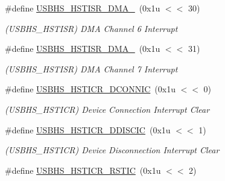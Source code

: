 \begin{DoxyCompactItemize}
\mbox{\label{group__SAME70__USBHS_ga7b43811bc4572ab7cb7fc1399f71a7b3}} 
\#define \mbox{\hyperlink{group__SAME70__USBHS_ga7b43811bc4572ab7cb7fc1399f71a7b3}{U\+S\+B\+H\+S\+\_\+\+H\+S\+T\+I\+S\+R\+\_\+\+D\+M\+A\+\_}}~(0x1u $<$$<$ 30)
\begin{DoxyCompactList}\small\item\em (U\+S\+B\+H\+S\+\_\+\+H\+S\+T\+I\+SR) D\+MA Channel 6 Interrupt \end{DoxyCompactList}\item 
\mbox{\label{group__SAME70__USBHS_ga8f49c8777ee76e4e23a0ea56235cdc9a}} 
\#define \mbox{\hyperlink{group__SAME70__USBHS_ga8f49c8777ee76e4e23a0ea56235cdc9a}{U\+S\+B\+H\+S\+\_\+\+H\+S\+T\+I\+S\+R\+\_\+\+D\+M\+A\+\_}}~(0x1u $<$$<$ 31)
\begin{DoxyCompactList}\small\item\em (U\+S\+B\+H\+S\+\_\+\+H\+S\+T\+I\+SR) D\+MA Channel 7 Interrupt \end{DoxyCompactList}\item 
\mbox{\label{group__SAME70__USBHS_ga0fb7643d5be82c2ea2172850b38484e2}} 
\#define \mbox{\hyperlink{group__SAME70__USBHS_ga0fb7643d5be82c2ea2172850b38484e2}{U\+S\+B\+H\+S\+\_\+\+H\+S\+T\+I\+C\+R\+\_\+\+D\+C\+O\+N\+N\+IC}}~(0x1u $<$$<$ 0)
\begin{DoxyCompactList}\small\item\em (U\+S\+B\+H\+S\+\_\+\+H\+S\+T\+I\+CR) Device Connection Interrupt Clear \end{DoxyCompactList}\item 
\mbox{\label{group__SAME70__USBHS_ga23995ee5d7ddabec341170ca98b6d624}} 
\#define \mbox{\hyperlink{group__SAME70__USBHS_ga23995ee5d7ddabec341170ca98b6d624}{U\+S\+B\+H\+S\+\_\+\+H\+S\+T\+I\+C\+R\+\_\+\+D\+D\+I\+S\+C\+IC}}~(0x1u $<$$<$ 1)
\begin{DoxyCompactList}\small\item\em (U\+S\+B\+H\+S\+\_\+\+H\+S\+T\+I\+CR) Device Disconnection Interrupt Clear \end{DoxyCompactList}\item 
\mbox{\label{group__SAME70__USBHS_ga84df2c9bc871c6336be81958fe823f08}} 
\#define \mbox{\hyperlink{group__SAME70__USBHS_ga84df2c9bc871c6336be81958fe823f08}{U\+S\+B\+H\+S\+\_\+\+H\+S\+T\+I\+C\+R\+\_\+\+R\+S\+T\+IC}}~(0x1u $<$$<$ 2)
$$
\end{DoxyCompactItemize}
